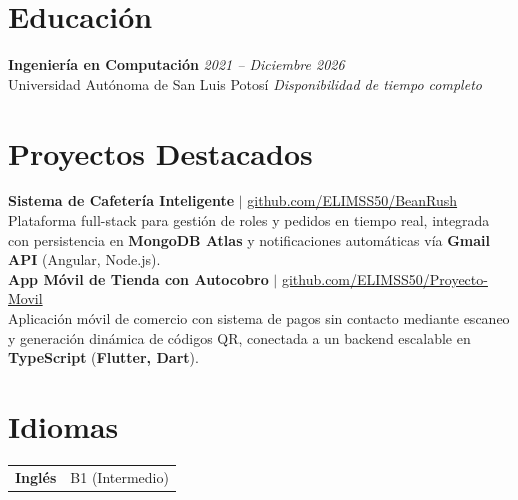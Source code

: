 \documentclass[10pt,a4paper]{article}
\begin{document}
\section{Educación}
\noindent\textbf{Ingeniería en Computación} \hfill \textit{2021 -- Diciembre 2026} \\
Universidad Autónoma de San Luis Potosí \hfill \textit{Disponibilidad de tiempo completo} \\[0.05em]

\section{Proyectos Destacados}

\noindent\textbf{Sistema de Cafetería Inteligente} $|$ \href{https://github.com/ELIMSS50/BeanRush}{github.com/ELIMSS50/BeanRush} \\
Plataforma full-stack para gestión de roles y pedidos en tiempo real, integrada con persistencia en \textbf{MongoDB Atlas} y notificaciones automáticas vía \textbf{Gmail API} (Angular, Node.js). \\[0em]

\noindent\textbf{App Móvil de Tienda con Autocobro} $|$ \href{https://github.com/ELIMSS50/Proyecto-Movil}{github.com/ELIMSS50/Proyecto-Movil} \\
Aplicación móvil de comercio con sistema de pagos sin contacto mediante escaneo y generación dinámica de códigos QR, conectada a un backend escalable en \textbf{TypeScript} (\textbf{Flutter, Dart}).

\section{Idiomas}
\begin{tabularx}{\textwidth}{@{}l>{\raggedright\arraybackslash}X@{}}
  \textbf{Inglés}  & B1 (Intermedio) \\
\end{tabularx}
\end{document}
